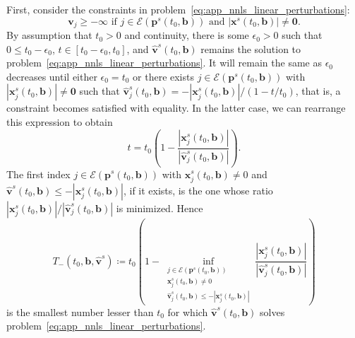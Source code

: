 \documentclass[11pt]{article}
\numberwithin{prop}{section}
\numberwithin{lem}{section}
\numberwithin{rem}{section}
\numberwithin{cor}{section}
\numberwithin{thm}{section}
\numberwithin{defn}{section}
\numberwithin{fact}{section}
\theoremstyle{plain}
\def\bb {\boldsymbol{b}}
\def\tzero {t_{0}}
\def\bp {\boldsymbol{p}}
\def\bv {\boldsymbol{v}}
\def\bx {\boldsymbol{x}}
\def\eqset {\mathcal{E}}
\begin{document}
First, consider the constraints in problem~\eqref{eq:app_nnls_linear_perturbations}:
\[
\text{$\bv_{j} \geqslant -\infty$ if $j \in \mathcal{E}(\bp^{s}(\tzero,\bb))$ and $|\bx^{s}(\tzero,\bb)| \neq \boldsymbol{0}$}.
\]
By assumption that $\tzero > 0$ and continuity, there is some $\epsilon_{0} > 0$ such that $0 \leqslant \tzero - \epsilon_0$,  $t \in [\tzero-\epsilon_{0},\tzero]$, and $\hat{\bv}^{s}(\tzero,\bb)$ remains the solution to problem~\eqref{eq:app_nnls_linear_perturbations}. It will remain the same as $\epsilon_{0}$ decreases until either $\epsilon_{0} = \tzero$ or there exists $j \in \mathcal{E}(\bp^{s}(\tzero,\bb))$ with $|\bx^{s}_{j}(\tzero,\bb)| \neq \boldsymbol{0}$ such that $\hat{\bv}^{s}_{j}(\tzero,\bb) = -|\bx^{s}_{j}(\tzero,\bb)|/(1-t/\tzero)$, that is, a constraint becomes satisfied with equality. In the latter case, we can rearrange this expression to obtain
	\[
	t = \tzero\left(1 - \frac{|\bx^{s}_{j}(\tzero,\bb)|}{|\hat{\bv}^{s}_{j}(\tzero,\bb)|}\right).
	\]
	The first index $j \in \mathcal{E}(\bp^{s}(\tzero,\bb))$ with $\bx^{s}_{j}(\tzero,\bb) \neq 0$ and $\hat{\bv}^{s}(\tzero,\bb) \leqslant -|\bx^{s}_{j}(\tzero,\bb)|$, if it exists, is the one whose ratio $|\bx^{s}_{j}(\tzero,\bb)|/|\hat{\bv}^{s}_{j}(\tzero,\bb)|$ is minimized. Hence
	\[
	T_{-}(\tzero,\bb,\hat{\bv}^{s}) \coloneqq \tzero \left(1 - \inf_{\substack{j \in \eqset(\bp^{s}(\tzero,\bb)) \\ \bx^{s}_{j}(\tzero,\bb) \neq 0 \\ \hat{\bv}_{j}^{s}(\tzero,\bb) \leqslant -|\bx_{j}^{s}(\tzero,\bb)|}} \frac{|\bx_{j}^{s}(\tzero,\bb)|}{|\hat{\bv}^{s}_{j}(\tzero,\bb)|}\right)
	\]
	is the smallest number lesser than $\tzero$ for which $\hat{\bv}^{s}(\tzero,\bb)$ solves problem~\eqref{eq:app_nnls_linear_perturbations}.
	
\end{document}
